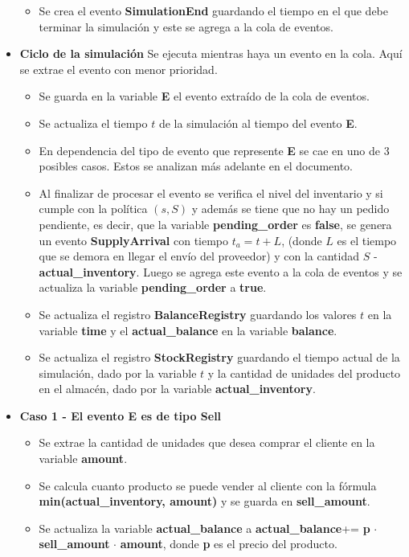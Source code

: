 \documentclass{article}
\begin{document}
\begin{itemize}
\begin{itemize}
        \item Se crea el evento \textbf{SimulationEnd} guardando el tiempo en el que debe terminar la simulación y este se agrega a la cola de eventos.
    \end{itemize}
    \item \textbf{Ciclo de la simulación} Se ejecuta mientras haya un evento en la cola. Aquí se extrae el evento con menor prioridad.
    \begin{itemize}
        \item Se guarda en la variable \textbf{E} el evento extraído de la cola de eventos.
        \item Se actualiza el tiempo $t$ de la simulación al tiempo del evento \textbf{E}.
        \item En dependencia del tipo de evento que represente \textbf{E} se cae en uno de 3 posibles casos. Estos se analizan más adelante en el documento.
        \item Al finalizar de procesar el evento se verifica el nivel del inventario y si cumple con la política $(s,S)$ y además se tiene que no hay un pedido pendiente, es decir, que la variable \textbf{pending\_order} es \textbf{false}, se genera un evento \textbf{SupplyArrival} con tiempo $t_a = t + L$, (donde $L$ es el tiempo que se demora en llegar el envío del proveedor) y con la cantidad $S$ - \textbf{actual\_inventory}. Luego se agrega este evento a la cola de eventos y se actualiza la variable \textbf{pending\_order} a \textbf{true}.
        \item Se actualiza el registro \textbf{BalanceRegistry} guardando los valores $t$ en la variable \textbf{time} y el \textbf{actual\_balance} en la variable \textbf{balance}.
        \item Se actualiza el registro \textbf{StockRegistry} guardando el tiempo actual de la simulación, dado por la variable $t$ y la cantidad de unidades del producto en el almacén, dado por la variable \textbf{actual\_inventory}.
    \end{itemize}
    \item \textbf{Caso 1 - El evento E es de tipo Sell}
    \begin{itemize}
        \item Se extrae la cantidad de unidades que desea comprar el cliente en la variable \textbf{amount}.
        \item Se calcula cuanto producto se puede vender al cliente con la fórmula \textbf{min(actual\_inventory, amount)} y se guarda en \textbf{sell\_amount}.
        \item Se actualiza la variable \textbf{actual\_balance} a \textbf{actual\_balance}+= \textbf{p} $\cdot$ \textbf{sell\_amount} $\cdot$ \textbf{amount}, donde \textbf{p} es el precio del producto.

\end{itemize}
\end{itemize}
\end{document}
